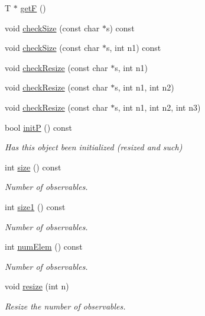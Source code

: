 \begin{DoxyCompactItemize}
T $\ast$ \mbox{\hyperlink{classENSEM_1_1OVector_a73065fd6ed2149ce8699996d691c4c42}{getF}} ()
\item 
void \mbox{\hyperlink{classENSEM_1_1OVector_a12d09a71bb2808a7404578da9ba41c4f}{check\+Size}} (const char $\ast$s) const
\item 
void \mbox{\hyperlink{classENSEM_1_1OVector_a1446ad09778db3a287fb5f6fec304b22}{check\+Size}} (const char $\ast$s, int n1) const
\item 
void \mbox{\hyperlink{classENSEM_1_1OVector_a95545451bb9d6be83ba32ad3dc2dab42}{check\+Resize}} (const char $\ast$s, int n1)
\item 
void \mbox{\hyperlink{classENSEM_1_1OVector_acd8960fbc5b7df8aabf14ca8ca50f7ab}{check\+Resize}} (const char $\ast$s, int n1, int n2)
\item 
void \mbox{\hyperlink{classENSEM_1_1OVector_ac909025f6c5d78479f5dcbef8151d571}{check\+Resize}} (const char $\ast$s, int n1, int n2, int n3)
\item 
bool \mbox{\hyperlink{classENSEM_1_1OVector_ae1c9e62826d9b61edc7f85d8f8aedf79}{initP}} () const
\begin{DoxyCompactList}\small\item\em Has this object been initialized (resized and such) \end{DoxyCompactList}\item 
int \mbox{\hyperlink{classENSEM_1_1OVector_a715979c319905eb60532815bb3c77aab}{size}} () const
\begin{DoxyCompactList}\small\item\em Number of observables. \end{DoxyCompactList}\item 
int \mbox{\hyperlink{classENSEM_1_1OVector_af2035852c6cefe80834b8e2a17648113}{size1}} () const
\begin{DoxyCompactList}\small\item\em Number of observables. \end{DoxyCompactList}\item 
int \mbox{\hyperlink{classENSEM_1_1OVector_a77771968912766dab2f1bd6ed7ccc876}{num\+Elem}} () const
\begin{DoxyCompactList}\small\item\em Number of observables. \end{DoxyCompactList}\item 
void \mbox{\hyperlink{classENSEM_1_1OVector_a2758b982bf7fa25b69d31fe8d7f72762}{resize}} (int n)
\begin{DoxyCompactList}\small\item\em Resize the number of observables. \end{DoxyCompactList}\item 

\end{DoxyCompactItemize}
